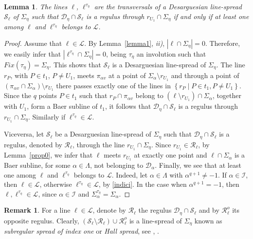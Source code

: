\documentclass[11pt]{article}
\newtheorem{lemma}[theorem]{Lemma}
\theoremstyle{definition}
\newtheorem{remark}[theorem]{Remark}
\numberwithin{equation}{section}
\def\cI{\mathcal I}
\def\cL{\mathcal L}
\def\cD{\mathcal D}
\def\cR{\mathcal R}
\def\cS{\mathcal S}
\begin{document}
\begin{lemma}\label{lemma3}
The lines $\ell$, $\ell^{\tau_{\eta}}$ are the transversals of a Desarguesian line-spread $\cS_\ell$ of $\Sigma_{\eta}$ such that $\cD_{\eta} \cap \cS_\ell$ is a regulus through $r_{U_1} \cap \Sigma_{\eta}$ if and only if at least
one among $\ell$ and $\ell^{\tau_\eta}$ belongs to $\cL$.
\end{lemma}
\begin{proof}
Assume that $\ell \in \cL$. By Lemma~\ref{lemma1}, {\em ii)}, $|\ell \cap \Sigma_{\eta}| = 0$. Therefore, we easily infer that $|\ell^{\tau_{\eta}} \cap \Sigma_{\eta}| = 0$, being $\tau_{\eta}$ an involution such that $Fix(\tau_{\eta}) = \Sigma_{\eta}$. This shows that $\cS_\ell$ is a Desarguesian line-spread  of $\Sigma_{\eta}$. The line $r_{P}$, with $P \in t_1$, $P \ne U_1$, meets $\pi_{\alpha v}$ at a point of $\Sigma_{\alpha} \setminus r_{U_1}$ and through a point of $\left(\pi_{\alpha v} \cap \Sigma_{\alpha} \right) \setminus r_{U_1}$ there passes exactly one of the lines in $\left\{r_{P} \mid P \in t_1, P \ne U_1\right\}$. Since the $q$ points $P \in t_1$ such that $r_{P} \cap \pi_{\alpha v}$ belong to $(\ell \setminus r_{U_1}) \cap \Sigma_{\alpha}$, together with $U_1$, form a Baer subline of $t_1$, it follows that $\cD_{\eta} \cap \cS_\ell$ is a regulus through $r_{U_1} \cap \Sigma_{\eta}$. Similarly if $\ell^{\tau_{\eta}} \in \cL$.

Viceversa, let  $\cS_{\ell}$ be a Desarguesian line-spread of $\Sigma_{\eta}$ such that $\cD_{\eta} \cap \cS_{\ell}$ is a regulus, denoted by $\cR_{\ell}$, through the line $r_{U_1} \cap \Sigma_{\eta}$. Since $r_{U_1} \in \cR_{\ell}$, by Lemma~\ref{prop0}, we infer that $\ell$ meets $r_{U_1}$ at exactly one point and $\ell \cap \Sigma_{\alpha}$ is a Baer subline, for some $\alpha \in \Lambda$, not belonging to $\cD_{\alpha}$. Finally, we see that at least one among $\ell$ and $\ell^{\tau_\eta}$ belongs to $\cL$. Indeed, let $\alpha \in \Lambda$ with $\alpha^{q+1} \ne -1$. If $\alpha \in \cI$, then $\ell \in \cL$, otherwise $\ell^{\tau_{\eta}} \in \cL$, by \eqref{indici}. In the case when $\alpha^{q+1} = -1$, then $\ell, \ell^{\tau_\eta} \in \cL$, since $\alpha \in \cI$ and $\Sigma_\alpha^{\tau_{\eta}} = \Sigma_{\alpha}$. 
\end{proof}

\begin{remark}\label{rem1}
For a line $\ell \in \cL$, denote by $\cR_\ell$ the regulus $\cD_{\eta} \cap \cS_\ell$ and by $\cR_\ell^{o}$ its opposite regulus. Clearly, $\left(\cS_\ell \setminus \cR_{\ell}\right) \cup \cR_{\ell}^{o}$ is a line-spread of $\Sigma_{\eta}$ known as {\em subregular spread of index one} or {\em Hall spread}, see \cite[pag. 54]{hirschfeld1985finite}, \cite[Section 8]{BruckBose}.
\end{remark}
\end{document}

